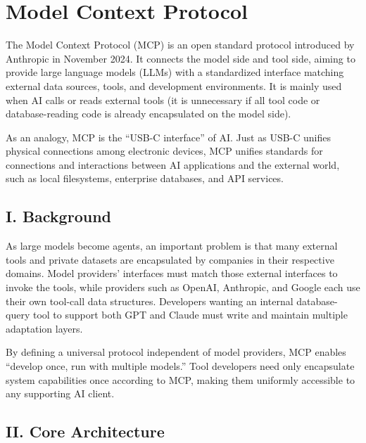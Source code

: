 \setcounter{section}{1}

\hypertarget{model-context-protocol}{%
\section{Model Context Protocol}\label{model-context-protocol}}

The Model Context Protocol (MCP) is an open standard protocol introduced by Anthropic in November 2024. It connects the model side and tool side, aiming to provide large language models (LLMs) with a standardized interface matching external data sources, tools, and development environments. It is mainly used when AI calls or reads external tools (it is unnecessary if all tool code or database-reading code is already encapsulated on the model side).

As an analogy, MCP is the ``USB-C interface'' of AI. Just as USB-C unifies physical connections among electronic devices, MCP unifies standards for connections and interactions between AI applications and the external world, such as local filesystems, enterprise databases, and API services.

\hypertarget{i.-background-6}{%
\subsection{I. Background}\label{i.-background-6}}

As large models become agents, an important problem is that many external tools and private datasets are encapsulated by companies in their respective domains. Model providers' interfaces must match those external interfaces to invoke the tools, while providers such as OpenAI, Anthropic, and Google each use their own tool-call data structures. Developers wanting an internal database-query tool to support both GPT and Claude must write and maintain multiple adaptation layers.

By defining a universal protocol independent of model providers, MCP enables ``develop once, run with multiple models.'' Tool developers need only encapsulate system capabilities once according to MCP, making them uniformly accessible to any supporting AI client.

\hypertarget{ii.-core-architecture}{%
\subsection{II. Core Architecture}\label{ii.-core-architecture}}

